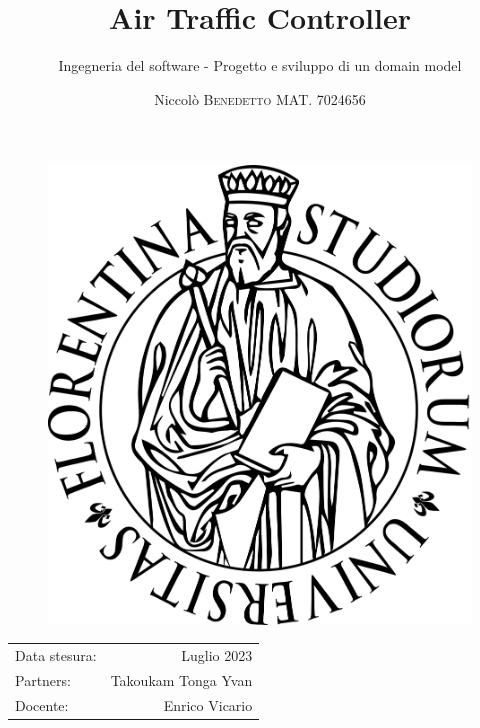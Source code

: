 \documentclass{article}
\title{Air Traffic Controller} %
\author{Ingegneria del software - Progetto e sviluppo di un domain model} %
\date{Niccolò \textsc{Benedetto MAT. 7024656}} %
\begin{document}
\begin{figure}
    \centering
    \includegraphics[scale=0.1]{Unifi_logo.png}
    \label{fig:enter-label}
\end{figure}

\maketitle

\begin{center}
\begin{tabular}{l r}
Data stesura: & Luglio 2023 \\%
Partners: & Takoukam Tonga Yvan \\ %

Docente: & Enrico Vicario %
\end{tabular}
\end{center}

\newpage

\fancyhf{} %
\fancyfoot[C]{\thepage}
\end{document}
